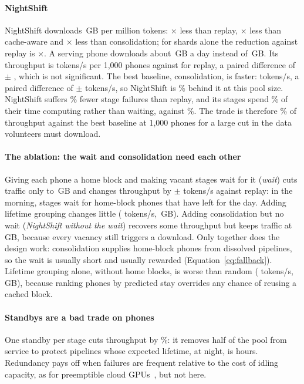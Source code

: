 \documentclass[preprint,review,12pt,authoryear]{elsarticle}
\begin{document}
\paragraph{NightShift} NightShift downloads \GBNS\,GB per million tokens:
\GBRatio$\times$ less than replay, \GBRatioCA$\times$ less than cache-aware and
\GBRatioConsol$\times$ less than consolidation; for shards alone the reduction
against replay is \ShardRatio$\times$. A serving phone downloads about
\PhoneGBNS\,GB a day instead of \PhoneGBReplay\,GB. Its throughput is \TputNS{}
tokens/s per 1,000 phones against \TputReplay{} for replay, a paired difference
of \DiffRepNS{} $\pm$ \CIRepNS, which is not significant. The best baseline,
consolidation, is faster: \TputConsol{} tokens/s, a paired difference of
\DiffConsNS{} $\pm$ \CIConsNS{} tokens/s, so NightShift is
\NSbehindConsolPct\% behind it at this pool size. NightShift suffers
\FailDropPct\% fewer stage failures than replay, and its stages spend
\UsefulNS\% of their time computing rather than waiting, against
\UsefulReplay\%. The trade is therefore \NSbehindConsolPct\% of throughput
against the best baseline at 1,000 phones for a large cut in the data
volunteers must download.

\paragraph{The ablation: the wait and consolidation need each other} Giving
each phone a home block and making vacant stages wait for it (\emph{wait})
cuts traffic only to \GBWait\,GB and changes throughput by \DiffRepWait{}
$\pm$ \CIRepWait{} tokens/s against replay: in the morning, stages wait for
home-block phones that have left for the day. Adding lifetime grouping changes
little (\TputSticky{} tokens/s, \GBSticky\,GB). Adding consolidation but no
wait (\emph{NightShift without the wait}) recovers some throughput but keeps
traffic at \GBNSNoWait\,GB, because every vacancy still triggers a download.
Only together does the design work: consolidation supplies home-block phones
from dissolved pipelines, so the wait is usually short and usually rewarded
(Equation~\ref{eq:fallback}). Lifetime grouping alone, without home blocks, is
worse than random (\TputLifetime{} tokens/s, \GBLifetime\,GB), because ranking
phones by predicted stay overrides any chance of reusing a cached block.

\paragraph{Standbys are a bad trade on phones} One standby per stage cuts
throughput by \StandbyDropPct\%: it removes half of the pool from service to
protect pipelines whose expected lifetime, at night, is hours. Redundancy pays
off when failures are frequent relative to the cost of idling capacity, as for
preemptible cloud GPUs~\citep{bamboo,oobleck}, but not here.
\end{document}

